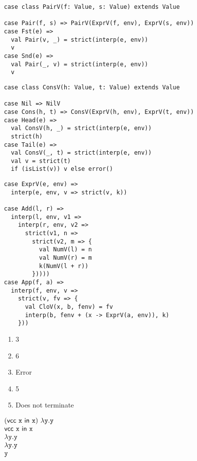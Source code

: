 \textbf{}
\vspace{-1em}
\begin{verbatim}
case class PairV(f: Value, s: Value) extends Value

case Pair(f, s) => PairV(ExprV(f, env), ExprV(s, env))
case Fst(e) =>
  val Pair(v, _) = strict(interp(e, env))
  v
case Snd(e) =>
  val Pair(_, v) = strict(interp(e, env))
  v
\end{verbatim}

\textbf{}
\vspace{-1em}
\begin{verbatim}
case class ConsV(h: Value, t: Value) extends Value

case Nil => NilV
case Cons(h, t) => ConsV(ExprV(h, env), ExprV(t, env))
case Head(e) =>
  val ConsV(h, _) = strict(interp(e, env))
  strict(h)
case Tail(e) =>
  val ConsV(_, t) = strict(interp(e, env))
  val v = strict(t)
  if (isList(v)) v else error()
\end{verbatim}

\textbf{}
\vspace{-1em}
\begin{verbatim}
case ExprV(e, env) =>
  interp(e, env, v => strict(v, k))

case Add(l, r) =>
  interp(l, env, v1 =>
    interp(r, env, v2 =>
      strict(v1, n =>
        strict(v2, m => {
          val NumV(l) = n
          val NumV(r) = m
          k(NumV(l + r))
        }))))
case App(f, a) =>
  interp(f, env, v =>
    strict(v, fv => {
      val CloV(x, b, fenv) = fv
      interp(b, fenv + (x -> ExprV(a, env)), k)
    }))
\end{verbatim}

\textbf{}
\begin{enumerate}
  \item 3
  \item 6
  \item Error
  \item 5
  \item Does not terminate
\end{enumerate}

\textbf{}

$\begin{array}{@{}l}
  \eapp{(\evcc{\cx}{\cx})}{\efun{\cy}{\cy}} \\
  \evcc{\cx}{\cx} \\
  \efun{\cy}{\cy} \\
  \efun{\cy}{\cy} \\
  \cy \\
\end{array}$
\\

